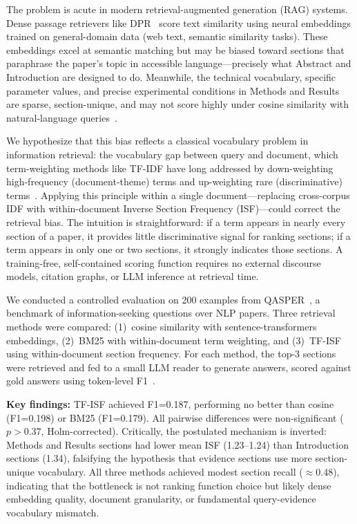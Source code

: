 \documentclass[11pt,letterpaper]{article}
\begin{document}
The problem is acute in modern retrieval-augmented generation (RAG) systems.
Dense passage retrievers like DPR~\citep{Karpukhin2020} score text similarity
using neural embeddings trained on general-domain data (web text, semantic
similarity tasks). These embeddings excel at semantic matching but may be biased
toward sections that paraphrase the paper's topic in accessible language—precisely
what Abstract and Introduction are designed to do. Meanwhile, the technical
vocabulary, specific parameter values, and precise experimental conditions in
Methods and Results are sparse, section-unique, and may not score highly under
cosine similarity with natural-language queries~\citep{Reichman2024}.

We hypothesize that this bias reflects a classical vocabulary problem in
information retrieval: the vocabulary gap between query and document, which
term-weighting methods like TF-IDF have long addressed by down-weighting
high-frequency (document-theme) terms and up-weighting rare (discriminative)
terms~\citep{SpärckJones1972}. Applying this principle within a single
document—replacing cross-corpus IDF with within-document Inverse Section Frequency
(ISF)—could correct the retrieval bias. The intuition is straightforward: if a
term appears in nearly every section of a paper, it provides little discriminative
signal for ranking sections; if a term appears in only one or two sections, it
strongly indicates those sections. A training-free, self-contained scoring
function requires no external discourse models, citation graphs, or LLM inference
at retrieval time.

We conducted a controlled evaluation on 200 examples from
QASPER~\citep{Dasigi2021}, a benchmark of information-seeking questions over NLP
papers. Three retrieval methods were compared: (1)~cosine similarity with
sentence-transformers embeddings, (2)~BM25 with within-document term weighting,
and (3)~TF-ISF using within-document section frequency. For each method, the
top-3 sections were retrieved and fed to a small LLM reader to generate answers,
scored against gold answers using token-level F1~\citep{Rajpurkar2018}.

\textbf{Key findings:} TF-ISF achieved F1=0.187, performing no better than cosine
(F1=0.198) or BM25 (F1=0.179). All pairwise differences were non-significant
($p > 0.37$, Holm-corrected). Critically, the postulated mechanism is inverted:
Methods and Results sections had lower mean ISF (1.23–1.24) than Introduction
sections (1.34), falsifying the hypothesis that evidence sections use more
section-unique vocabulary. All three methods achieved modest section recall
($\approx$0.48), indicating that the bottleneck is not ranking function choice but
likely dense embedding quality, document granularity, or fundamental
query-evidence vocabulary mismatch.
\end{document}
